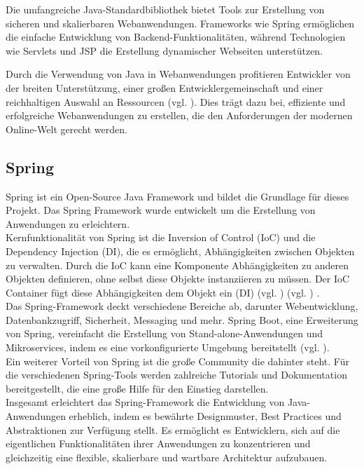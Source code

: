 \documentclass[fontsize=12pt,openright,oneside,paper=a4,BCOR=1cm]{scrbook}
\begin{document}
Die umfangreiche Java-Standardbibliothek bietet Tools zur Erstellung von sicheren und skalierbaren Webanwendungen. Frameworks wie Spring ermöglichen die einfache Entwicklung von Backend-Funktionalitäten, während Technologien wie Servlets und JSP die Erstellung dynamischer Webseiten unterstützen.

Durch die Verwendung von Java in Webanwendungen profitieren Entwickler von der breiten Unterstützung, einer großen Entwicklergemeinschaft und einer reichhaltigen Auswahl an Ressourcen (vgl. \cite{scalosoftjava}). Dies trägt dazu bei, effiziente und erfolgreiche Webanwendungen zu erstellen, die den Anforderungen der modernen Online-Welt gerecht werden.

\subsection{Spring}

Spring ist ein Open-Source Java Framework und bildet die Grundlage für dieses Projekt. Das Spring Framework wurde entwickelt um die Erstellung von Anwendungen zu erleichtern. \\
Kernfunktionalität von Spring ist die Inversion of Control (IoC) und die Dependency Injection (DI), die es ermöglicht, Abhängigkeiten zwischen Objekten zu verwalten. Durch die IoC kann eine Komponente Abhängigkeiten zu anderen Objekten definieren, ohne selbst diese Objekte instanziieren zu müssen. Der IoC Container fügt diese Abhängigkeiten dem Objekt ein (DI) (vgl. \cite{springioc}) (vgl. \cite{springiocMisc}) . \\
Das Spring-Framework deckt verschiedene Bereiche ab, darunter Webentwicklung, Datenbankzugriff, Sicherheit, Messaging und mehr. Spring Boot, eine Erweiterung von Spring, vereinfacht die Erstellung von Stand-alone-Anwendungen und Mikroservices, indem es eine vorkonfigurierte Umgebung bereitstellt (vgl. \cite{springboot}). \\
Ein weiterer Vorteil von Spring ist die große Community die dahinter steht. Für die verschiedenen Spring-Tools werden zahlreiche Tutorials und Dokumentation bereitgestellt, die eine große Hilfe für den Einstieg darstellen. \\

Insgesamt erleichtert das Spring-Framework die Entwicklung von Java-Anwendungen erheblich, indem es bewährte Designmuster, Best Practices und Abstraktionen zur Verfügung stellt. Es ermöglicht es Entwicklern, sich auf die eigentlichen Funktionalitäten ihrer Anwendungen zu konzentrieren und gleichzeitig eine flexible, skalierbare und wartbare Architektur aufzubauen.
\end{document}
